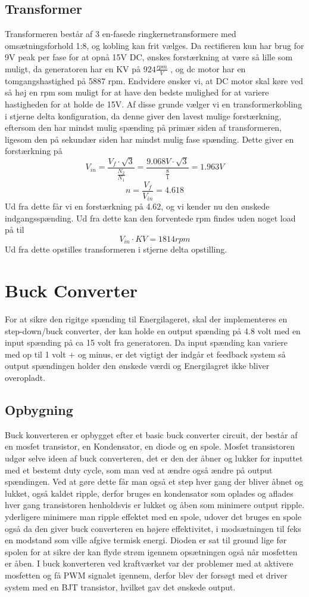 \documentclass[../main.tex]{subfiles}
\begin{document}
\subsection{Transformer}
Transformeren består af 3 en-fasede ringkernetransformere med omsætningsforhold 1:8, og kobling kan frit vælges. Da rectifieren kun har brug for 9V peak per fase for at opnå 15V DC, ønskes forstærkning at være så lille som muligt, da generatoren har en KV på $ 924 \frac{rpm}{V}$  , og dc motor har en tomgangshastighed på 5887 rpm. Endvidere ønsker vi, at DC motor skal køre ved så høj en rpm som muligt for at have den bedste mulighed for at variere hastigheden for at holde de 15V. Af disse grunde vælger vi en transformerkobling i stjerne delta konfiguration, da denne giver den lavest mulige forstærkning, eftersom den har mindst mulig spænding på primær siden af transformeren, ligesom den på sekundær siden har mindst mulig fase spænding. Dette giver en forstærkning på
$$ V_{in} =\frac{ V_f \cdot \sqrt{3}}{\frac{N_2}{N_1}} = \frac{9.068V \cdot \sqrt{3}}{\frac{8}{1}} = 1.963V$$
$$n = \frac{V_f}{V_{in}}=4.618$$
Ud fra dette får vi en forstærkning på 4.62, og vi kender nu den ønskede indgangsspænding. Ud fra dette kan den forventede rpm findes uden noget load på til
$$V_{in} \cdot KV = 1814rpm$$
Ud fra dette opstilles transformeren i stjerne delta opstilling.

\section{Buck Converter}
For at sikre den rigitge spænding til Energilageret, skal der implementeres en step-down/buck converter, der kan holde en output spænding på 4.8 volt med en input spænding på ca 15 volt fra generatoren. Da input spænding kan variere med op til 1 volt + og minus, er det vigtigt der indgår et feedback system så output spændingen holder den ønskede værdi og Energilagret ikke bliver overopladt.

\subsection{Opbygning}
Buck konverteren er opbygget efter et basic buck converter circuit, der består af en mosfet transistor, en Kondensator, en diode og en spole. Mosfet transistoren udgør selve ideen af buck converteren, det er den der åbner og lukker for inputtet med et bestemt duty cycle, som man ved at ændre også ændre på output spændingen. Ved at gøre dette får man også et step hver gang der bliver åbnet og lukket, også kaldet ripple, derfor bruges en kondensator som oplades og aflades hver gang transistoren henholdsvis er lukket og åben som minimere output ripple. yderligere minimere man ripple effektet med en spole, udover det bruges en spole også da den giver buck converteren en højere effektivitet, i modsætningen til feks en modstand som ville afgive termisk energi. Dioden er sat til ground lige før spolen for at sikre der kan flyde strøm igennem opsætningen også når mosfetten er åben. 
I buck konverteren ved kraftværket var der problemer med at aktivere mosfetten og få PWM signalet igennem, derfor blev der forsøgt med et driver system med en BJT transistor, hvilket gav det ønskede output. 
\end{document}
